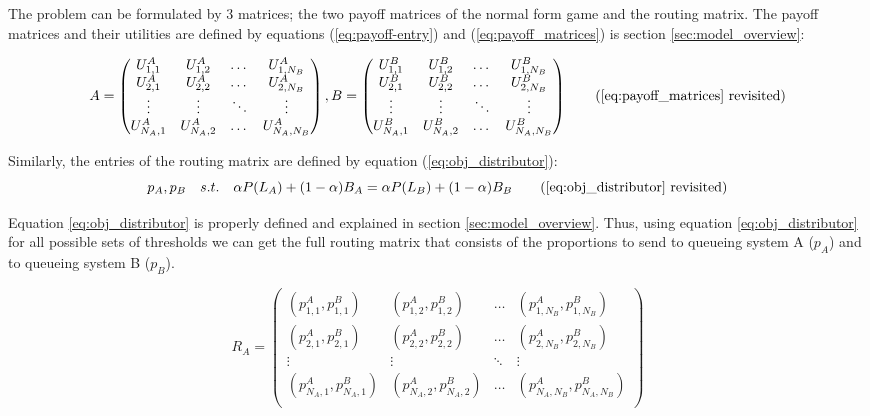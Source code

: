 The problem can be formulated by 3 matrices; the two payoff matrices of the 
normal form game and the routing matrix.
The payoff matrices and their utilities are defined by equations 
(\ref{eq:payoff-entry}) and (\ref{eq:payoff_matrices}) is section 
\ref{sec:model_overview}:

\begin{equation*}
    A = 
    \begin{pmatrix}
        U_{1,1}^A & U_{1,2}^A & \dots & U_{1,N_B}^A \\
        U_{2,1}^A & U_{2,2}^A & \dots & U_{2,N_B}^A \\
        \vdots & \vdots & \ddots & \vdots \\
        U_{N_A,1}^A & U_{N_A,2}^A & \dots & U_{N_A,N_B}^A \\
    \end{pmatrix},
    B = 
    \begin{pmatrix}
        U_{1,1}^B & U_{1,2}^B & \dots & U_{1,N_B}^B \\
        U_{2,1}^B & U_{2,2}^B & \dots & U_{2,N_B}^B \\
        \vdots & \vdots & \ddots & \vdots \\
        U_{N_A,1}^B & U_{N_A,2}^B & \dots & U_{N_A,N_B}^B \\
    \end{pmatrix}
    \tag{\ref{eq:payoff_matrices} revisited}
\end{equation*}


Similarly, the entries of the routing matrix are defined by equation 
(\ref{eq:obj_distributor}):
\begin{equation*}
    p_A, p_B \quad s.t. \quad \alpha P(L_A) + (1 - \alpha) B_A = \alpha P(L_B) 
    + (1 - \alpha) B_B \tag{\ref{eq:obj_distributor} revisited}
\end{equation*}

Equation \ref{eq:obj_distributor} is properly defined and explained in section 
\ref{sec:model_overview}.
Thus, using equation \ref{eq:obj_distributor} for all possible sets of 
thresholds we can get the full routing matrix that consists of the proportions
to send to queueing system A (\(p_A\)) and to queueing system B (\(p_B\)).

\begin{equation}\label{eq:routing_matrix}
    R_A = 
    \begin{pmatrix}
        (p_{1,1}^A, p_{1,1}^B) & (p_{1,2}^A, p_{1,2}^B) & \dots & 
        (p_{1,N_B}^A, p_{1,N_B}^B) \\
        (p_{2,1}^A, p_{2,1}^B) & (p_{2,2}^A, p_{2,2}^B) & \dots & 
        (p_{2,N_B}^A, p_{2,N_B}^B) \\
        \vdots & \vdots & \ddots & \vdots \\
        (p_{N_A,1}^A, p_{N_A,1}^B) & (p_{N_A,2}^A, p_{N_A,2}^B) & \dots & 
        (p_{N_A,N_B}^A, p_{N_A,N_B}^B) \\
    \end{pmatrix}
\end{equation}

